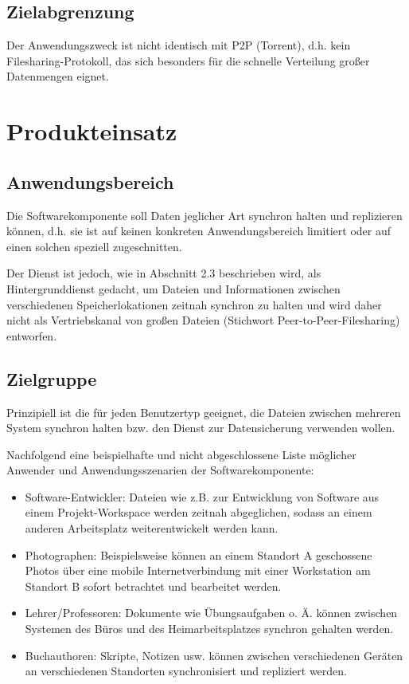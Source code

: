 \documentclass[12pt,oneside,a4paper,bibtotoc,liststotoc,pointlessnumbers]{scrartcl}
\begin{document}
\subsection{Zielabgrenzung}
Der Anwendungszweck ist nicht identisch mit P2P (Torrent), d.h. kein Filesharing-Protokoll, das sich besonders für die schnelle Verteilung großer Datenmengen eignet.
\newpage
\section{Produkteinsatz}
\subsection{Anwendungsbereich}
Die Softwarekomponente soll Daten jeglicher Art synchron halten und replizieren können, d.h. sie ist auf keinen konkreten Anwendungsbereich limitiert oder auf einen solchen speziell zugeschnitten.\par
Der Dienst ist jedoch, wie in Abschnitt 2.3 beschrieben wird, als Hintergrunddienst gedacht, um Dateien und Informationen zwischen verschiedenen Speicherlokationen zeitnah synchron zu halten und wird daher nicht als Vertriebskanal von großen Dateien (Stichwort Peer-to-Peer-Filesharing) entworfen.
\subsection{Zielgruppe}
Prinzipiell ist die für jeden Benutzertyp geeignet, die Dateien zwischen mehreren System synchron halten bzw. den Dienst zur Datensicherung verwenden wollen.\par
Nachfolgend eine beispielhafte und nicht abgeschlossene Liste möglicher Anwender und Anwendungsszenarien der Softwarekomponente:
\begin{itemize}
	\item Software-Entwickler: Dateien wie z.B. zur Entwicklung von Software aus einem Projekt-Workspace werden zeitnah abgeglichen, sodass an einem anderen Arbeitsplatz weiterentwickelt werden kann.
	\item Photographen: Beispielsweise können an einem Standort A geschossene Photos über eine mobile Internetverbindung mit einer Workstation am Standort B sofort betrachtet und bearbeitet werden. 
	\item Lehrer/Professoren: Dokumente wie Übungsaufgaben o. Ä. können zwischen Systemen des Büros und des Heimarbeitsplatzes synchron gehalten werden.
	\item Buchauthoren: Skripte, Notizen usw. können zwischen verschiedenen Geräten an verschiedenen Standorten synchronisiert und repliziert werden. 
\end{itemize}
\end{document}
